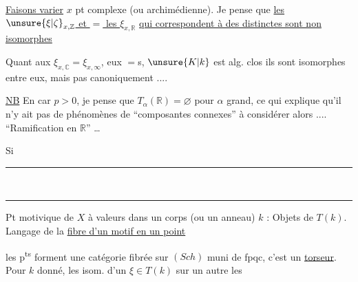 \uline{Faisons varier} $x$ pt complexe (ou  archimédienne). Je pense que \uline{les $\unsure{\xi|\zeta}_{x,\mathbb Z}$ et $=$ les $\xi_{x,\mathbb R}$}  \uline{qui correspondent à des  distinctes sont non isomorphes}

Quant aux $\xi_{x,\mathbb C}=\xi_{x,\infty}$, eux $=$s,   $\unsure{K|k}$ est  alg. clos ils sont isomorphes entre eux, mais pas canoniquement ....

\uline{NB} En car $p>0$, je pense que $T_{\alpha}(\mathbb R)=\varnothing$ pour $\alpha$ grand, ce qui explique qu'il n'y ait pas de phénomènes de ``composantes connexes'' à considérer alors .... ``Ramification en $\mathbb R$'' \ldots

Si

\begin{center}\rule{3cm}{0.5pt}\\[-0.65em]\rule{2.6cm}{0.5pt}\end{center}

Pt motivique de $X$ à valeurs dans un corps (ou un anneau) $k$ : Objets de $T(k)$. Langage de la \uline{fibre d'un motif en un point}

les p\textsuperscript{ts} forment une catégorie fibrée sur $(Sch)$ muni de fpqc,  c'est un \uline{torseur}. Pour $k$ donné, les isom. d'un  $\xi\in T(k)$ sur un autre  les

